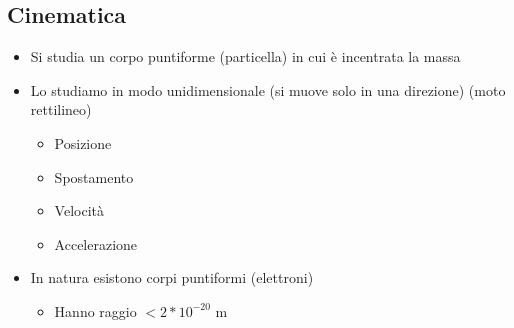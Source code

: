 \documentclass{report}
\begin{document}
\subsection{Cinematica}
\begin{itemize}
  \item Si studia un corpo puntiforme (particella) in cui è incentrata la massa
  \item Lo studiamo in modo unidimensionale (si muove solo in una direzione) (moto rettilineo)
        \begin{itemize}
          \item Posizione
          \item Spostamento
          \item Velocità
          \item Accelerazione
        \end{itemize}
  \item In natura esistono corpi puntiformi (elettroni)
        \begin{itemize}
          \item Hanno raggio $<2*10^{-20}$ m
        \end{itemize}
\end{itemize}
\end{document}
